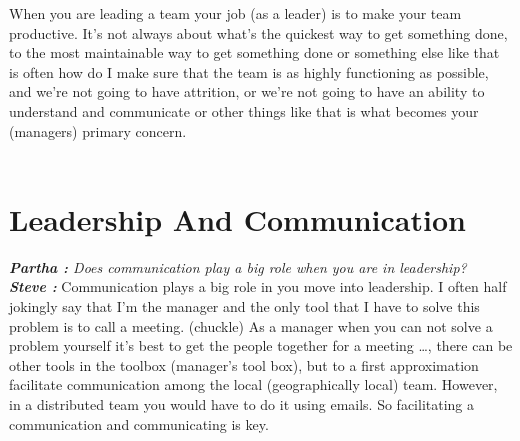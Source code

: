 \documentclass[a4paper, 12pt]{article}
\begin{document}
\begin{flushleft}
        When you are leading a team your job (as a leader) is to make your team productive. It's not always about what's the quickest way to get something done, to the most maintainable way to get something done or something else like that is often how do I make sure that the team is as highly functioning as possible, and we're not going to have attrition, or we're not going to have an ability to understand and communicate or other things like that is what becomes your (managers) primary concern. \\~\\

        \section*{Leadership And Communication}
	\textit {\textbf{Partha :} Does communication play a big role when you are in leadership?} \\ 
 	\textbf {\textit {Steve :}} Communication plays a big role in you move into leadership. I often half jokingly say that I'm the manager and the only tool that I have to solve this problem is to call a meeting. (chuckle) As a manager when you can not solve a problem yourself it’s best to get the people together for a meeting \ldots, there can be other tools in the toolbox (manager’s tool box), but to a first approximation facilitate communication among the local (geographically local) team. However, in a distributed team you would have to do it using emails. So facilitating a communication and communicating is key. \\~\\


\end{flushleft}
\end{document}
